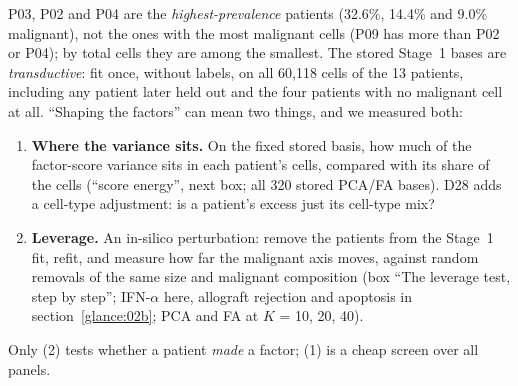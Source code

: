 P03, P02 and P04 are the \emph{highest-prevalence} patients (32.6\%, 14.4\% and 9.0\% malignant), not the ones with the most malignant cells (P09 has more than P02 or P04); by total cells they are among the smallest. The stored Stage~1 bases are \emph{transductive}: fit once, without labels, on all 60,118 cells of the 13 patients, including any patient later held out and the four patients with no malignant cell at all. ``Shaping the factors'' can mean two things, and we measured both:
\begin{enumerate}[label=(\arabic*)]
\item \textbf{Where the variance sits.} On the fixed stored basis, how much of the factor-score variance sits in each patient's cells, compared with its share of the cells (``score energy'', next box; all 320 stored PCA/FA bases). D28 adds a cell-type adjustment: is a patient's excess just its cell-type mix?
\item \textbf{Leverage.} An in-silico perturbation: remove the patients from the Stage~1 fit, refit, and measure how far the malignant axis moves, against random removals of the same size and malignant composition (box ``The leverage test, step by step''; IFN-$\alpha$ here, allograft rejection and apoptosis in section~\ref{glance:02b}; PCA and FA at $K$ = 10, 20, 40).
\end{enumerate}
Only (2) tests whether a patient \emph{made} a factor; (1) is a cheap screen over all panels.

